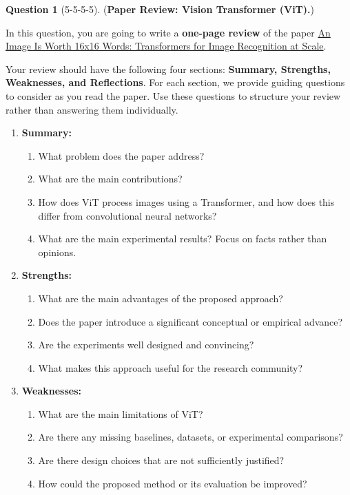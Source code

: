 \documentclass[12pt]{article}
\theoremstyle{definition}
\newtheorem{exercise}{Question}%
\begin{document}
\begin{exercise}[5-5-5-5]
(\textbf{Paper Review: Vision Transformer (ViT).})


In this question, you are going to write a \textbf{one-page review} of the paper
\href{https://arxiv.org/abs/2010.11929}
{An Image Is Worth 16x16 Words: Transformers for Image Recognition at Scale}.

Your review should have the following four sections:
\textbf{Summary, Strengths, Weaknesses, and Reflections}.
For each section, we provide guiding questions to consider as you read
the paper. Use these questions to structure your review rather than
answering them individually.

\begin{enumerate}[label=(\theexercise.\arabic*)]

    \item \textbf{Summary:}
    \begin{enumerate}
        \item What problem does the paper address?
        \item What are the main contributions?
        \item How does ViT process images using a Transformer,
        and how does this differ from convolutional neural networks?
        \item What are the main experimental results?
        Focus on facts rather than opinions.
    \end{enumerate}

    \item \textbf{Strengths:}
    \begin{enumerate}
        \item What are the main advantages of the proposed approach?
        \item Does the paper introduce a significant conceptual
        or empirical advance?
        \item Are the experiments well designed and convincing?
        \item What makes this approach useful for the research community?
    \end{enumerate}

    \item \textbf{Weaknesses:}
    \begin{enumerate}
        \item What are the main limitations of ViT?
        \item Are there any missing baselines, datasets,
        or experimental comparisons?
        \item Are there design choices that are not sufficiently justified?
        \item How could the proposed method or its evaluation be improved?
    \end{enumerate}


\end{enumerate}
\end{exercise}
\end{document}
